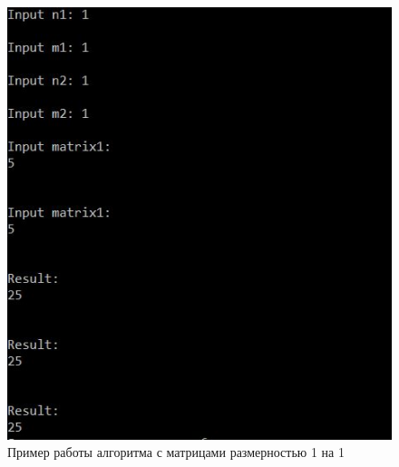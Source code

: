 \documentclass[12pt]{report}
\begin{document}
\begin{figure}[h]
\centering
\includegraphics[width=1\linewidth]{matrix11.jpg}
\caption{Пример работы алгоритма с матрицами размерностью 1 на 1}
\label{fig:mpr}
\end{figure}
\end{document}
